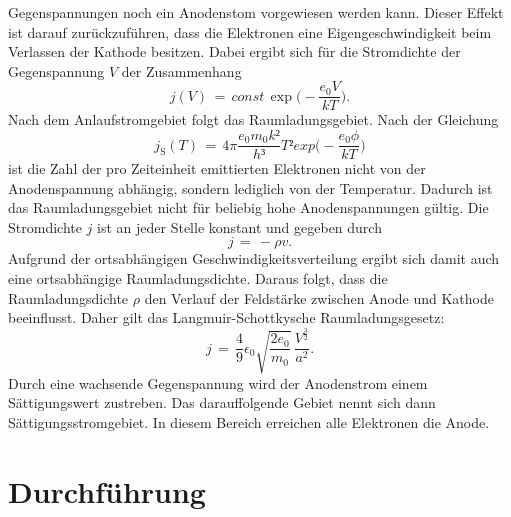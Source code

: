\documentclass[
  bibliography=totoc,     %
  captions=tableheading,  %
  titlepage=firstiscover, %
]{scrartcl}
\begin{document}
Gegenspannungen noch ein Anodenstom vorgewiesen werden kann. Dieser Effekt
ist darauf zurückzuführen, dass die Elektronen eine Eigengeschwindigkeit
beim Verlassen der Kathode besitzen. Dabei ergibt sich für die Stromdichte
der Gegenspannung $V$ der Zusammenhang
\begin{equation}
  j(V)\,=\,const\,\exp\Big(-\frac{e_0V}{kT}\Big).
  \label{eqn:stromdichte}
\end{equation}
Nach dem Anlaufstromgebiet folgt das Raumladungsgebiet. Nach der Gleichung
\begin{equation}
  j_\mathup{S} (T)\,=\,4\pi \frac{e_0 m_0 k²}{h³} T² exp\Big(-\frac{e_0 \phi}{kT}\Big)
  \label{eqn:richardson}
\end{equation}
ist die Zahl der pro Zeiteinheit emittierten Elektronen nicht von der Anodenspannung abhängig, sondern lediglich von der Temperatur. Dadurch ist das Raumladungsgebiet nicht für beliebig hohe Anodenspannungen gültig. Die Stromdichte $j$ ist an jeder Stelle konstant und gegeben durch
\begin{equation}
  j\,=\,-\rho v.
  \label{eqn:j}
\end{equation}
Aufgrund der ortsabhängigen Geschwindigkeitsverteilung ergibt sich damit auch eine
ortsabhängige Raumladungsdichte.
Daraus folgt, dass die Raumladungsdichte $\rho$ den Verlauf der Feldstärke zwischen Anode und Kathode beeinflusst. Daher gilt das Langmuir-Schottkysche Raumladungsgesetz:
\begin{equation}
  j\,=\,\frac{4}{9} \epsilon_0 \sqrt{\frac{2e_0}{m_0}}\,\frac{V^{\frac{3}{2}}}{a^2}.
  \label{eqn:raumladung}
\end{equation}
\noindent
Durch eine wachsende Gegenspannung wird der Anodenstrom einem Sättigungswert zustreben. Das darauffolgende Gebiet nennt sich dann Sättigungsstromgebiet. In diesem Bereich erreichen alle Elektronen die Anode.
\section{Durchführung}
\label{sec:durchführung}
\end{document}
